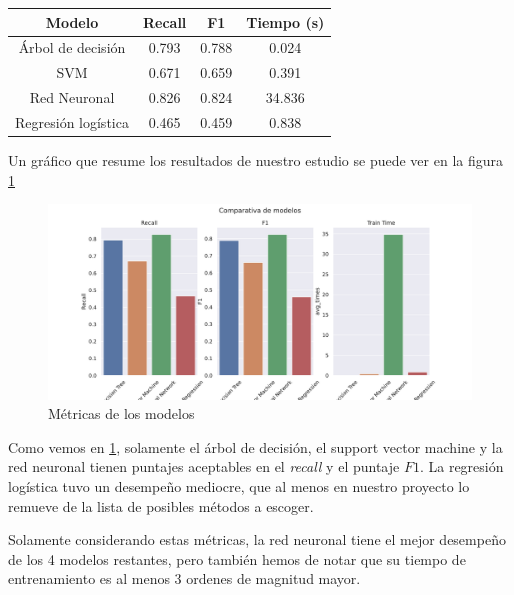 \documentclass[journal]{IEEEtran}                                                          %
\begin{document}
        \begin{center}
            \begin{tabular}{ |c|c|c|c| }
                \hline
                Modelo & Recall & F1 & Tiempo (s) \\
                \hline
                Árbol de decisión & 0.793 & 0.788 & 0.024 \\
                \hline
                SVM & 0.671 & 0.659 & 0.391 \\
                \hline
                Red Neuronal & 0.826 & 0.824 & 34.836 \\
                \hline
                Regresión logística & 0.465 & 0.459 & 0.838 \\
                \hline
            \end{tabular}
        \end{center}

        Un gráfico que resume los resultados de nuestro estudio se puede ver en la figura \ref{comparison}

        \begin{figure}[!htb]
            \centering
            \includegraphics[scale=0.25]{../report/img/comparison-results.pdf}
            \caption{Métricas de los modelos}
            \label{comparison}
        \end{figure}

        Como vemos en \ref{comparison}, solamente el árbol de decisión, el support vector machine y la red neuronal tienen puntajes aceptables en el \emph{recall} y el puntaje $F1$. La regresión logística tuvo un desempeño mediocre, que al menos en nuestro proyecto lo remueve de la lista de posibles métodos a escoger.

        Solamente considerando estas métricas, la red neuronal tiene el mejor desempeño de los 4 modelos restantes, pero también hemos de notar que su tiempo de entrenamiento es al menos 3 ordenes de magnitud mayor.
\end{document}

